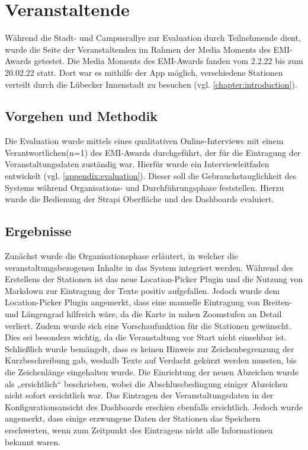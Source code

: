 \section{Veranstaltende}

Während die Stadt- und Campusrallye zur Evaluation durch Teilnehmende dient,
wurde die Seite der Veranstaltenden im Rahmen der Media Moments des EMI-Awards
getestet. Die Media Moments des EMI-Awards fanden vom 2.2.22 bis zum 20.02.22
statt. Dort war es mithilfe der App möglich, verschiedene Stationen verteilt
durch die Lübecker Innenstadt zu besuchen (vgl. \autoref{chapter:introduction}).

\subsection{Vorgehen und Methodik}

Die Evaluation wurde mittels eines qualitativen Online-Interviews mit einem
Verantwortlichen(n=1) des EMI-Awards durchgeführt, der für die Eintragung der
Veranstaltungsdaten zuständig war. Hierfür wurde ein Interviewleitfaden
entwickelt (vgl. \autoref{appendix:evaluation}). Dieser soll die
Gebrauchstauglichkeit des Systems während Organisations- und Durchführungsphase
feststellen. Hierzu wurde die Bedienung der Strapi Oberfläche und des Dashboards
evaluiert.

\subsection{Ergebnisse}

Zunächst wurde die Organisationsphase erläutert, in welcher die
veranstaltungsbezogenen Inhalte in das System integriert werden. Während des
Erstellens der Stationen ist das neue Location-Picker Plugin und die Nutzung von
Markdown zur Eintragung der Texte positiv aufgefallen. Jedoch wurde dem
Location-Picker Plugin angemerkt, dass eine manuelle Eintragung von Breiten- und
Längengrad hilfreich wäre, da die Karte in nahen Zoomstufen an Detail verliert.
Zudem wurde sich eine Vorschaufunktion für die Stationen gewünscht. Dies sei
besonders wichtig, da die Veranstaltung vor Start nicht einsehbar ist.
Schließlich wurde bemängelt, dass es keinen Hinweis zur Zeichenbegrenzung der
Kurzbeschreibung gab, weshalb Texte auf Verdacht gekürzt werden mussten, bis die
Zeichenlänge eingehalten wurde. Die Einrichtung der neuen Abzeichen wurde als
„ersichtlich“ beschrieben, wobei die Abschlussbedingung einiger Abzeichen nicht
sofort ersichtlich war. Das Eintragen der Veranstaltungsdaten in der
Konfigurationsansicht des Dashboards erschien ebenfalls ersichtlich. Jedoch
wurde angemerkt, dass einige erzwungene Daten der Stationen das Speichern
erschwerten, wenn zum Zeitpunkt des Eintragens nicht alle Informationen bekannt
waren.

